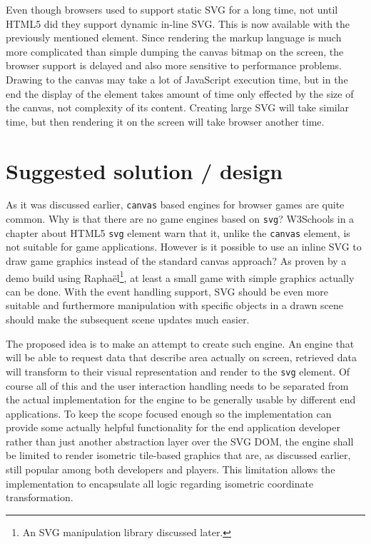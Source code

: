 \documentclass[11pt,oneside, final]{fithesis2}
\begin{document}
Even though browsers used to support static SVG for a long time, not until HTML5 did they support dynamic in-line SVG\cite{w3_html5}. This is now available with the previously mentioned element. Since rendering the markup language is much more complicated than simple dumping the canvas bitmap on the screen, the browser support is delayed and also more sensitive to performance problems. Drawing to the canvas may take a lot of JavaScript execution time, but in the end the display of the element takes amount of time only effected by the size of the canvas, not complexity of its content. Creating large SVG will take similar time, but then rendering it on the screen will take browser another time.

\chapter{Suggested solution / design}
\label{solution}
As it was discussed earlier, \texttt{canvas} based engines for browser games are quite common. Why is that there are no game engines based on \texttt{svg}? W3Schools in a chapter about HTML5 \texttt{svg} element warn that it, unlike the \texttt{canvas} element, is not suitable for game applications\cite{html5svg}. However is it possible to use an inline SVG to draw game graphics instead of the standard canvas approach? As proven by a demo build using Raphaël\footnote{An SVG manipulation library discussed later.}, at least a small game with simple graphics actually can be done\cite{raphaelfpsdemo}. With the event handling support, SVG should be even more suitable and furthermore manipulation with specific objects in a drawn scene should make the subsequent scene updates much easier.

The proposed idea is to make an attempt to create such engine. An engine that will be able to request data that describe area actually on screen, retrieved data will transform to their visual representation and render to the \texttt{svg} element. Of course all of this and the user interaction handling needs to be separated from the actual implementation for the engine to be generally usable by different end applications. To keep the scope focused enough so the implementation can provide some actually helpful functionality for the end application developer rather than just another abstraction layer over the SVG DOM, the engine shall be limited to render isometric tile-based graphics that are, as discussed earlier, still popular among both developers and players. This limitation allows the implementation to encapsulate all logic regarding isometric coordinate transformation.
\end{document}
